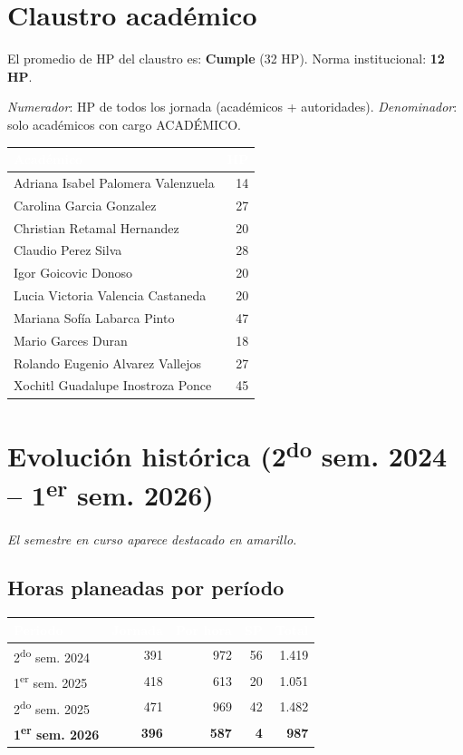 \documentclass[11pt, a4paper]{article}
\begin{document}
\section{Claustro académico}

El promedio de HP del claustro es: \textcolor{green!60!black}{\textbf{Cumple}} (32 HP). Norma institucional: \textbf{12 HP}.

\textit{Numerador}: HP de todos los jornada (académicos + autoridades). \textit{Denominador}: solo académicos con cargo ACADÉMICO.

\begin{tabular}{lr}
\toprule
\rowcolor{usachDark} \textbf{\textcolor{white}{Académico}} & \textbf{\textcolor{white}{HP}} \\
\midrule
Adriana Isabel Palomera Valenzuela & 14 \\
\rowcolor{rowEven}Carolina Garcia Gonzalez & 27 \\
Christian Retamal Hernandez & 20 \\
\rowcolor{rowEven}Claudio Perez Silva & 28 \\
Igor Goicovic Donoso & 20 \\
\rowcolor{rowEven}Lucia Victoria Valencia Castaneda & 20 \\
Mariana Sofía Labarca Pinto & 47 \\
\rowcolor{rowEven}Mario Garces Duran & 18 \\
Rolando Eugenio Alvarez Vallejos & 27 \\
\rowcolor{rowEven}Xochitl Guadalupe Inostroza Ponce & 45 \\
\bottomrule
\end{tabular}

\section{Evolución histórica (2\textsuperscript{do} sem. 2024 -- 1\textsuperscript{er} sem. 2026)}

\textit{El semestre en curso aparece destacado en amarillo.}

\subsection{Horas planeadas por período}

\begin{tabular}{lrrrr}
\toprule
\rowcolor{usachDark} \textbf{\textcolor{white}{Periodo}} & \textbf{\textcolor{white}{Jornada}} & \textbf{\textcolor{white}{Por hora}} & \textbf{\textcolor{white}{SP}} & \textbf{\textcolor{white}{Total}} \\
\midrule
2\textsuperscript{do} sem. 2024 & 391 & 972 & 56 & 1.419 \\
\rowcolor{rowEven}1\textsuperscript{er} sem. 2025 & 418 & 613 & 20 & 1.051 \\
2\textsuperscript{do} sem. 2025 & 471 & 969 & 42 & 1.482 \\
\rowcolor{rowHighlight}\textbf{1\textsuperscript{er} sem. 2026} & \textbf{396} & \textbf{587} & \textbf{4} & \textbf{987} \\
\bottomrule
\end{tabular}
\end{document}
